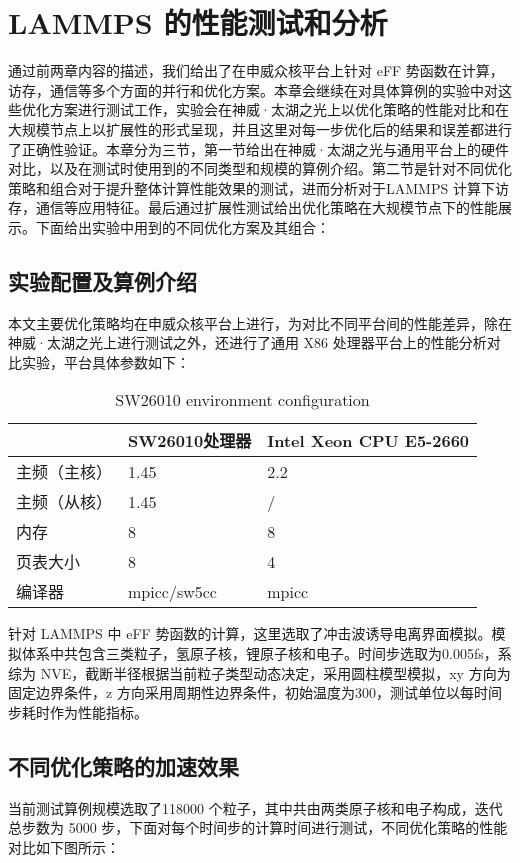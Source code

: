 
\chapter{LAMMPS 的性能测试和分析}
通过前两章内容的描述，我们给出了在申威众核平台上针对 eFF 势函数在计算，访存，通信等多个方面的并行和优化方案。本章会继续在对具体算例的实验中对这些优化方案进行测试工作，实验会在神威·太湖之光上以优化策略的性能对比和在大规模节点上以扩展性的形式呈现，并且这里对每一步优化后的结果和误差都进行了正确性验证。本章分为三节，第一节给出在神威·太湖之光与通用平台上的硬件对比，以及在测试时使用到的不同类型和规模的算例介绍。第二节是针对不同优化策略和组合对于提升整体计算性能效果的测试，进而分析对于LAMMPS 计算下访存，通信等应用特征。最后通过扩展性测试给出优化策略在大规模节点下的性能展示。下面给出实验中用到的不同优化方案及其组合：

\section{实验配置及算例介绍}
本文主要优化策略均在申威众核平台上进行，为对比不同平台间的性能差异，除在神威·太湖之光上进行测试之外，还进行了通用 X86 处理器平台上的性能分析对比实验，平台具体参数如下：

\begin{table}[]
     \centering
  \caption{SW26010 environment configuration}
\begin{tabular}{lll}
\hline
       & SW26010处理器  & Intel Xeon CPU E5-2660 \\ \hline
主频（主核） & 1.45        & 2.2                    \\
主频（从核） & 1.45        & /                      \\
内存     & 8           & 8                      \\
页表大小   & 8           & 4                      \\
编译器    & mpicc/sw5cc & mpicc                  \\ \hline
\end{tabular}
\end{table}

针对 LAMMPS 中 eFF 势函数的计算，这里选取了冲击波诱导电离界面模拟。模拟体系中共包含三类粒子，氢原子核，锂原子核和电子。时间步选取为0.005fs，系综为 NVE，截断半径根据当前粒子类型动态决定，采用圆柱模型模拟，xy 方向为固定边界条件，z 方向采用周期性边界条件，初始温度为300，测试单位以每时间步耗时作为性能指标。

\section{不同优化策略的加速效果}
当前测试算例规模选取了118000 个粒子，其中共由两类原子核和电子构成，迭代总步数为 5000 步，下面对每个时间步的计算时间进行测试，不同优化策略的性能对比如下图所示：

